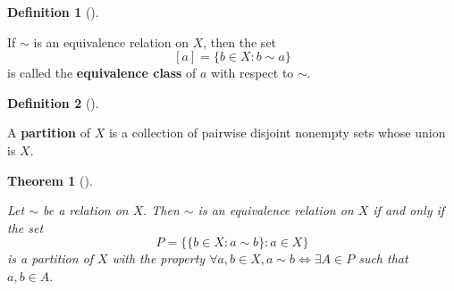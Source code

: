 \documentclass[
  letterpaper,
  10pt,
  reqno,
  twopage,
  openany]{book}
\theoremstyle{plain}
\theoremstyle{definition}
\theoremstyle{definition}
\newtheorem{definition}{Definition}[chapter]
\theoremstyle{definition}
\theoremstyle{plain}
\theoremstyle{plain}
\newtheorem{theorem}{Theorem}[chapter]
\theoremstyle{remark}
\begin{document}
\leavevmode{}%
\begin{definition}[]\label{def-equivalence-class}

If \(\sim\) is an equivalence relation on \(X\), then the set
\[[a]=\{b\in X : b\sim a\}\] is called the 
\textbf{equivalence class} of \(a\) with respect to \(\sim.\)

\end{definition}

\leavevmode{}%
\begin{definition}[]\label{def-partition}

A  \textbf{partition} of \(X\) is a collection of
pairwise disjoint nonempty sets whose union is \(X.\)

\end{definition}

\leavevmode{}%
\begin{theorem}[]\label{thm-equivalence-relation-partition}

Let \(\sim\) be a relation on \(X.\) Then \(\sim\) is an equivalence
relation on \(X\) if and only if the set \[
P=\{\{b\in X: a\sim b \}: a\in X\}
\] is a partition of \(X\) with the property
\(\forall a,b\in X, a\sim b \Leftrightarrow \exists A\in P\) such that
\(a,b\in A.\)

\end{theorem}
\end{document}

